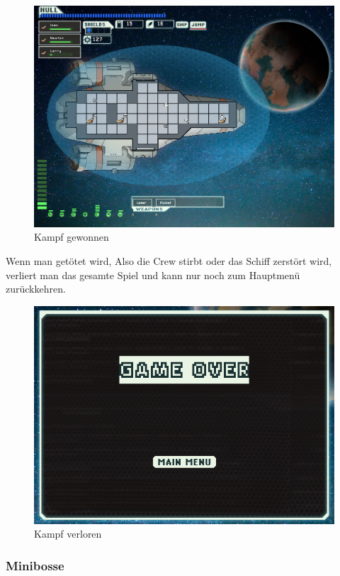 \documentclass[fontsize=12pt,paper=a4,twoside]{scrartcl}
\begin{document}
\begin{figure}[H]
\centering
\includegraphics[width=1\linewidth]{DasSpiel/Kampf/fightwin.png}
\caption{Kampf gewonnen}
\end{figure}

Wenn man getötet wird, Also die Crew stirbt oder das Schiff zerstört wird, verliert man das gesamte Spiel und kann nur noch zum Hauptmenü zurückkehren. 

\begin{figure}[H]
\centering
\includegraphics[width=1\linewidth]{DasSpiel/Kampf/fightlose.png}
\caption{Kampf verloren}
\end{figure}

\subsubsection{Minibosse}
\end{document}
